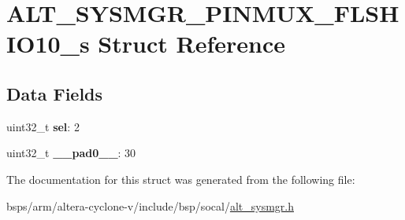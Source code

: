 \hypertarget{structALT__SYSMGR__PINMUX__FLSHIO10__s}{}\section{A\+L\+T\+\_\+\+S\+Y\+S\+M\+G\+R\+\_\+\+P\+I\+N\+M\+U\+X\+\_\+\+F\+L\+S\+H\+I\+O10\+\_\+s Struct Reference}
\label{structALT__SYSMGR__PINMUX__FLSHIO10__s}
\subsection*{Data Fields}
\begin{DoxyCompactItemize}
\item 
\mbox{\label{structALT__SYSMGR__PINMUX__FLSHIO10__s_a53543fce33b1f4ec4d7b4841c1ab37cc}} 
uint32\+\_\+t {\bfseries sel}\+: 2
\item 
\mbox{\label{structALT__SYSMGR__PINMUX__FLSHIO10__s_ad5a2ecadd65a31020a611a37882f5f39}} 
uint32\+\_\+t {\bfseries \+\_\+\+\_\+pad0\+\_\+\+\_\+}\+: 30
\end{DoxyCompactItemize}


The documentation for this struct was generated from the following file\+:\begin{DoxyCompactItemize}
\item 
bsps/arm/altera-\/cyclone-\/v/include/bsp/socal/\mbox{\hyperlink{alt__sysmgr_8h}{alt\+\_\+sysmgr.\+h}}\end{DoxyCompactItemize}
